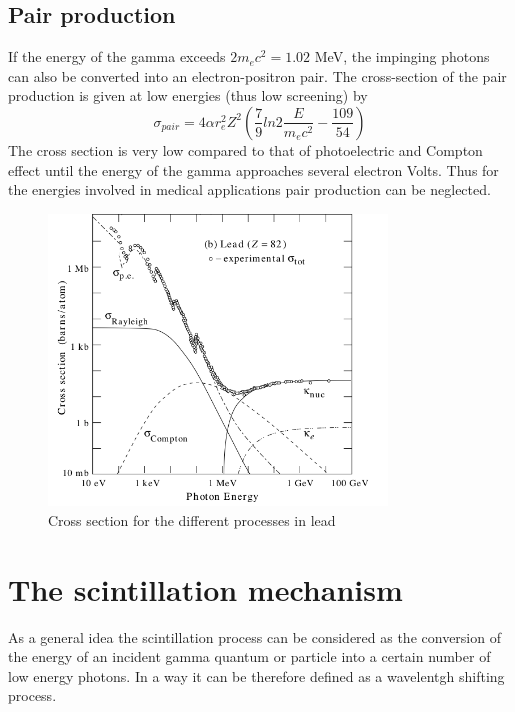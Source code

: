 \subsection{Pair production}

If the energy of the gamma exceeds $2m_{e}c^{2} = 1.02$ MeV, the impinging photons can also be converted into an electron-positron pair. The cross-section of the pair production is given at low energies (thus low screening) by
\begin{equation}
\sigma _{pair} = 4\alpha r_{e}^{2} Z^{2} \left( \frac{7}{9}ln2\frac{E}{m_{e}c^{2}} - \frac{109}{54}\right)
\end{equation}
The cross section is very low compared to that of photoelectric and Compton effect until the energy of the gamma approaches several electron Volts. Thus for the energies involved in medical applications pair production can be neglected.


\begin{figure}
\centering
\includegraphics[width=9cm]{../Pictures/Chapter_2/sigma_gamma.pdf}
\caption[$\gamma$ cross section]{Cross section for the different processes in lead}
\label{fig:cross_section}
\end{figure}
\newpage
\section{The scintillation mechanism}

As a general idea the scintillation process can be considered as the conversion of the energy of an incident gamma quantum or particle into a certain number of low energy photons\cite{Rodnyi1997}. In a way it can be therefore defined as a wavelentgh shifting process\cite{Lecoq2006}.

